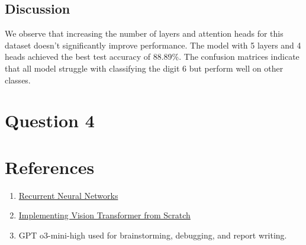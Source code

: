 \documentclass{article}
\begin{document}
\subsection*{Discussion}
We observe that increasing the number of layers and attention heads for this dataset doesn't significantly improve performance. The model with 5 layers and 4 heads achieved the best test accuracy of 88.89\%. The confusion matrices indicate that all model struggle with classifying the digit 6 but perform well on other classes.  



\section*{Question 4}


\section*{References}
\begin{enumerate}
    \item \href{https://d2l.ai/chapter_recurrent-neural-networks/rnn.html}{Recurrent Neural Networks}
    \item \href{https://tintn.github.io/Implementing-Vision-Transformer-from-Scratch/}{Implementing Vision Transformer from Scratch}
    \item GPT o3-mini-high used for brainstorming, debugging, and report writing.
\end{enumerate}
\end{document}
